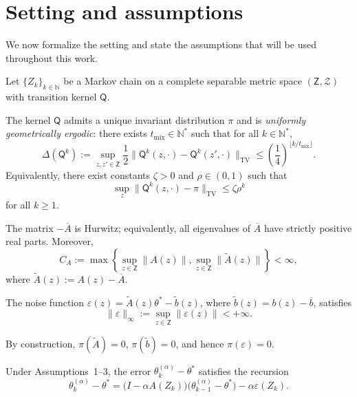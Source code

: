 \section{Setting and assumptions}
\label{sec:assumptions}

We now formalize the setting and state the assumptions that will be used
throughout this work.

Let $\{Z_k\}_{k\in\mathbb{N}}$ be a Markov chain on a complete separable
metric space $(\mathsf{Z},\mathcal{Z})$ with transition kernel $\mathsf{Q}$.

\begin{assumption}
  The kernel $\mathsf{Q}$ admits a unique invariant distribution $\pi$ and is
  \emph{uniformly geometrically ergodic}: there exists
  $t_{\mathrm{mix}}\in\mathbb{N}^*$ such that for all
  $k\in\mathbb{N}^*$,
  \[
    \Delta(\mathsf{Q}^k)
      :=\sup_{z,z'\in\mathsf{Z}}\frac{1}{2}
        \bigl\lVert
          \mathsf{Q}^k(z,\mathord{\cdot})
          -\mathsf{Q}^k(z',\mathord{\cdot})
        \bigr\rVert_{\mathrm{TV}}
      \leq \left(\frac{1}{4}\right)^{\lfloor k/t_{\mathrm{mix}}\rfloor}.
  \]
  Equivalently, there exist constants $\zeta>0$ and $\rho\in(0,1)$ such that
  \[
    \sup_z\bigl\lVert
      \mathsf{Q}^k(z,\mathord{\cdot})-\pi
    \bigr\rVert_{\mathrm{TV}}
      \leq\zeta\rho^k
  \]
  for all $k\geq1$.
\end{assumption}

\begin{assumption}
  The matrix $-\overline{A}$ is Hurwitz; equivalently, all eigenvalues of
  $\overline{A}$ have strictly positive real parts. Moreover,
  \[
    C_A:=\max\left\lbrace
      \sup_{z\in\mathsf{Z}}\lVert A(z)\rVert,
      \sup_{z\in\mathsf{Z}}\lVert\widetilde{A}(z)\rVert
    \right\rbrace<\infty,
  \]
  where $\widetilde{A}(z):=A(z)-\overline{A}$.
\end{assumption}

\begin{assumption}
  The noise function
  $\varepsilon(z)=\widetilde{A}(z)\theta^*-\widetilde{b}(z)$, where
  $\widetilde{b}(z)=b(z)-\overline{b}$, satisfies
  \[
    \lVert\varepsilon\rVert_\infty
      :=\sup_{z\in\mathsf{Z}}\lVert\varepsilon(z)\rVert<+\infty.
  \]
\end{assumption}

By construction, $\pi(\widetilde{A})=0$, $\pi(\widetilde{b})=0$, and hence
$\pi(\varepsilon)=0$.

Under Assumptions~1--3, the error $\theta_k^{(\alpha)}-\theta^*$ satisfies
the recursion
\begin{equation}
  \theta_k^{(\alpha)}-\theta^*
  =\bigl(I-\alpha A(Z_k)\bigr)
    \bigl(\theta_{k-1}^{(\alpha)}-\theta^*\bigr)
    -\alpha\varepsilon(Z_k).
  \label{eq:error-recursion}
\end{equation}
